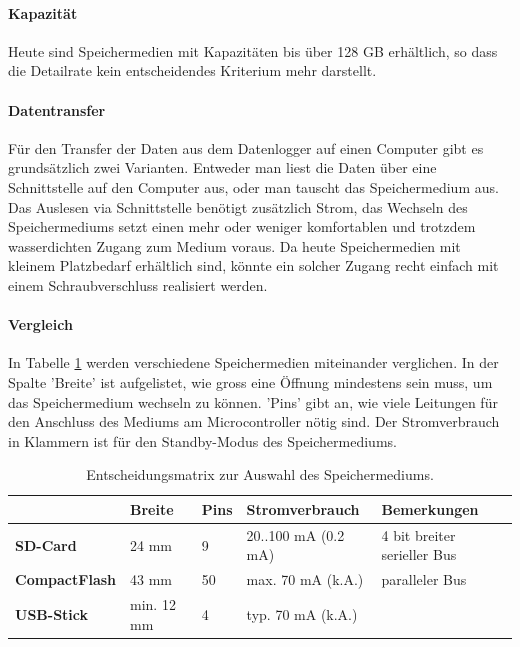 \paragraph{Kapazität} Heute sind Speichermedien mit Kapazitäten bis über 128 GB erhältlich, so dass die Detailrate kein entscheidendes Kriterium mehr darstellt.

\paragraph{Datentransfer} Für den Transfer der Daten aus dem Datenlogger auf einen Computer gibt es grundsätzlich zwei Varianten. Entweder man liest die Daten über eine Schnittstelle auf den Computer aus, oder man tauscht das Speichermedium aus. Das Auslesen via Schnittstelle benötigt zusätzlich Strom, das Wechseln des Speichermediums setzt einen mehr oder weniger komfortablen und trotzdem wasserdichten Zugang zum Medium voraus. Da heute Speichermedien mit kleinem Platzbedarf erhältlich sind, könnte ein solcher Zugang recht einfach mit einem Schraubverschluss realisiert werden.

\paragraph{Vergleich} In Tabelle \ref{table.speichermedium} werden verschiedene Speichermedien miteinander verglichen. In der Spalte 'Breite' ist aufgelistet, wie gross eine Öffnung mindestens sein muss, um das Speichermedium wechseln zu können. 'Pins' gibt an, wie viele Leitungen für den Anschluss des Mediums am Microcontroller nötig sind. Der Stromverbrauch in Klammern ist für den Standby-Modus des Speichermediums.

\begin{table}
\begin{tabular}{|l|l|l|l|l|}
	\hline
	                      & \textbf{Breite} & \textbf{Pins} & \textbf{Stromverbrauch} & \textbf{Bemerkungen}        \\ \hline
	\textbf{SD-Card}      & 24 mm           & 9             & 20..100 mA (0.2 mA)     & 4 bit breiter serieller Bus \\ \hline
	\textbf{CompactFlash} & 43 mm           & 50            & max. 70 mA (k.A.)       & paralleler Bus              \\ \hline
	\textbf{USB-Stick}    & min. 12 mm      & 4             & typ. 70 mA (k.A.) &  \\ \hline
\end{tabular} 
\caption{Entscheidungsmatrix zur Auswahl des Speichermediums.}
\label{table.speichermedium}
\end{table} 

